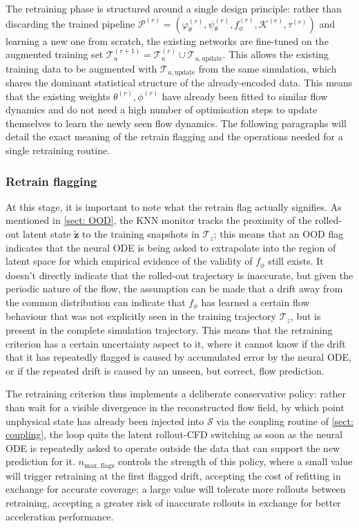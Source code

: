 The retraining phase is structured around a single design principle: rather than discarding the trained pipeline $\mathcal{P}^{(r)}=(\varphi_\theta^{(r)}, \psi_\theta^{(r)}, f_\phi^{(r)}, \mathcal{K}^{(r)}, \tau^{(r)})$ and learning a new one from scratch, the existing networks are fine-tuned on the augmented training set $\boldsymbol{\mathcal{T}}_u^{(r+1)} = \boldsymbol{\mathcal{T}}_u^{(r)} \cup \mathcal{T}_{u,\text{update}}$. This allows the existing training data to be augmented with $\mathcal{T}_{u,\text{update}}$ from the same simulation, which shares the dominant statistical structure of the already-encoded data. This means that the existing weights $\theta^{(r)}, \phi^{(r)}$ have already been fitted to similar flow dynamics and do not need a high number of optimisation steps to update themselves to learn the newly seen flow dynamics. The following paragraphs will detail the exact meaning of the retrain flagging and the operations needed for a single retraining routine. 


\subsubsection{Retrain flagging}

At this stage, it is important to note what the retrain flag actually signifies. As mentioned in \autoref{sect: OOD}, the KNN monitor tracks the proximity of the rolled-out latent state $\tilde{\mathbf{z}}$ to the training snapshots in $\boldsymbol{\mathcal{T}}_z$; this means that an OOD flag indicates that the neural ODE is being asked to extrapolate into the region of latent space for which empirical evidence of the validity of $f_\phi$ still exists. It doesn't directly indicate that the rolled-out trajectory is inaccurate, but given the periodic nature of the flow, the assumption can be made that a drift away from the common distribution can indicate that $f_\phi$ has learned a certain flow behaviour that was not explicitly seen in the training trajectory $\boldsymbol{\mathcal{T}}_z$, but is present in the complete simulation trajectory. This means that the retraining criterion has a certain uncertainty aspect to it, where it cannot know if the drift that it has repeatedly flagged is caused by accumulated error by the neural ODE, or if the repeated drift is caused by an unseen, but correct, flow prediction. 

The retraining criterion thus implements a deliberate conservative policy: rather than wait for a visible divergence in the reconstructed flow field, by which point unphysical state has already been injected into $\mathcal{S}$ via the coupling routine of \autoref{sect: coupling}, the loop quits the latent rollout-CFD switching as soon as the neural ODE is repeatedly asked to operate outside the data that can support the new prediction for it. $n_\text{max, flags}$ controls the strength of this policy, where a small value will trigger retraining at the first flagged drift, accepting the cost of refitting in exchange for accurate coverage; a large value will tolerate more rollouts between retraining, accepting a greater risk of inaccurate rollouts in exchange for better acceleration performance. 


